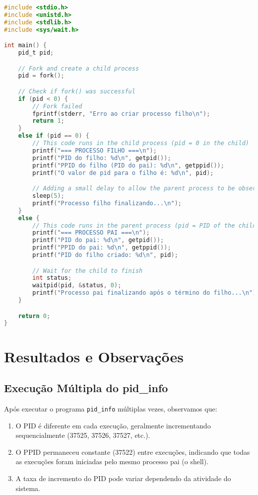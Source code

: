 \documentclass[a4paper,11pt]{article}
\begin{document}
\begin{lstlisting}[language=C, caption=Programa fork\_example.c]
#include <stdio.h>
#include <unistd.h>
#include <stdlib.h>
#include <sys/wait.h>

int main() {
    pid_t pid;

    // Fork and create a child process
    pid = fork();

    // Check if fork() was successful
    if (pid < 0) {
        // Fork failed
        fprintf(stderr, "Erro ao criar processo filho\n");
        return 1;
    }
    else if (pid == 0) {
        // This code runs in the child process (pid = 0 in the child)
        printf("=== PROCESSO FILHO ===\n");
        printf("PID do filho: %d\n", getpid());
        printf("PPID do filho (PID do pai): %d\n", getppid());
        printf("O valor de pid para o filho é: %d\n", pid);

        // Adding a small delay to allow the parent process to be observed
        sleep(5);
        printf("Processo filho finalizando...\n");
    }
    else {
        // This code runs in the parent process (pid = PID of the child)
        printf("=== PROCESSO PAI ===\n");
        printf("PID do pai: %d\n", getpid());
        printf("PPID do pai: %d\n", getppid());
        printf("PID do filho criado: %d\n", pid);

        // Wait for the child to finish
        int status;
        waitpid(pid, &status, 0);
        printf("Processo pai finalizando após o término do filho...\n");
    }

    return 0;
}
\end{lstlisting}

\section{Resultados e Observações}

\subsection{Execução Múltipla do pid\_info}

Após executar o programa \texttt{pid\_info} múltiplas vezes, observamos que:

\begin{enumerate}
    \item O PID é diferente em cada execução, geralmente incrementando sequencialmente (37525, 37526, 37527, etc.).
    \item O PPID permaneceu constante (37522) entre execuções, indicando que todas as execuções foram iniciadas pelo mesmo processo pai (o shell).
    \item A taxa de incremento do PID pode variar dependendo da atividade do sistema.
\end{enumerate}
\end{document}

